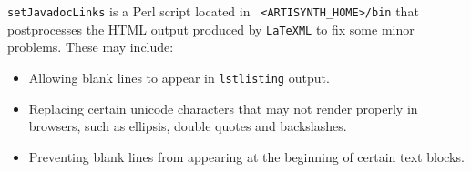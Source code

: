 \documentclass{article}
\begin{document}
{\tt setJavadocLinks} is a Perl script located in {\tt
<ARTISYNTH\_HOME>/bin} that postprocesses the HTML output produced 
by {\tt LaTeXML} to fix some minor problems. These may include:

\begin{itemize}

\item Allowing blank lines to appear in {\tt lstlisting} output.

\item Replacing certain unicode characters that may not render
properly in browsers, such as ellipsis, double quotes and backslashes.

\item Preventing blank lines from appearing at the beginning
of certain text blocks.

\end{itemize}
\end{document}
